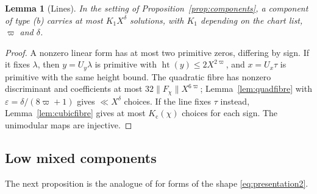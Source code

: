 \documentclass[11pt,reqno]{amsart}
\newtheorem{lemma}[theorem]{Lemma}
\theoremstyle{definition}
\theoremstyle{remark}
\numberwithin{equation}{section}
\newcommand{\eps}{\varepsilon}\newcommand{\card}{\#}
\newcommand{\hgt}{\operatorname{ht}}
\begin{document}
\begin{lemma}[Lines]\label{lem:lines}
In the setting of Proposition~\ref{prop:components}, a
component of type \textup{(b)} carries at most $K_1X^{\delta}$ solutions,
with $K_1$ depending on the chart list, $\varpi$ and $\delta$.
\end{lemma}
\begin{proof}
A nonzero linear form has at most two primitive zeros, differing by
sign. If it fixes $\lambda$, then $y=U_y\lambda$ is primitive with
$\hgt(y)\le2X^{2\varpi}$, and $x=U_x\tau$ is primitive with the
same height bound. The quadratic fibre has nonzero discriminant
and coefficients at most $32\|F_\chi\|X^{6\varpi}$;
Lemma~\ref{lem:quadfibre} with $\eps=\delta/(8\varpi+1)$ gives
$\ll X^\delta$ choices. If the line fixes $\tau$ instead,
Lemma~\ref{lem:cubicfibre} gives at most $K_{\mathrm c}(\chi)$ choices
for each sign. The unimodular maps are injective.
\end{proof}

\subsection{Low mixed components}
The next proposition is the analogue of
\cite[Proposition~5.3]{powerful} for forms of the shape
\eqref{eq:presentation2}.
\end{document}
